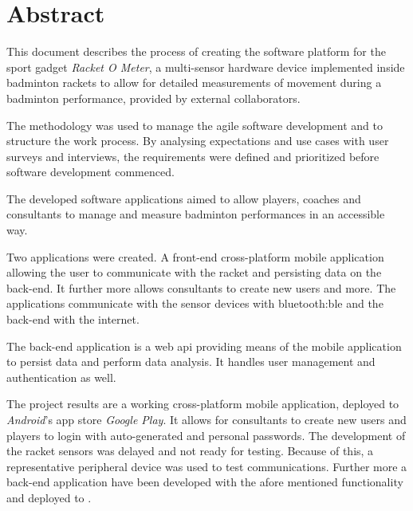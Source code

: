\chapter*{Abstract}
This document describes the process of creating the software platform for the sport gadget \textit{Racket O Meter}, a multi-sensor hardware device implemented inside badminton rackets to allow for detailed measurements of movement during a badminton performance, provided by external collaborators.

The  methodology was used to manage the agile software development and to structure the work process.
By analysing expectations and use cases with user surveys and interviews, the requirements were defined and prioritized before software development commenced.

The developed software applications aimed to allow players, coaches and consultants to manage and measure badminton performances in an accessible way.

Two applications were created.
A front-end cross-platform mobile application allowing the user to communicate with the racket and persisting data on the back-end.
It further more allows consultants to create new users and more.
The applications communicate with the sensor devices with \gls{bluetooth:ble} and the back-end with the internet.

The back-end application is a web \gls{api} providing means of the mobile application to persist data and perform data analysis.
It handles user management and authentication as well.

The project results are a working cross-platform mobile application, deployed to \textit{Android}'s app store \textit{Google Play}.
It allows for consultants to create new users and players to login with auto-generated and personal passwords.
The development of the racket sensors was delayed and not ready for testing.
Because of this, a representative peripheral device was used to test  communications.
Further more a back-end application have been developed with the afore mentioned functionality and deployed to .
